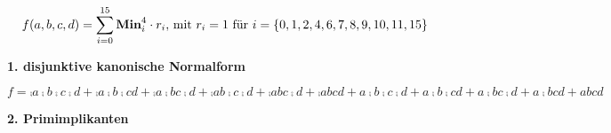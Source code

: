 \documentclass{CInf_practice}
\begin{document}
\begin{align*}
f(a,b,c,d) = \sum\limits^{15}_{i=0} \text{\bf Min}^{4}_i \cdot r_i, &\text{ mit } r_i=1 \text{ für } i = \left\{0,1,2,4,6,7,8,9,10,11,15\right\}
\end{align*}
%

\textbf{1. disjunktive kanonische Normalform}

$f = \comp a \comp b \comp c \comp d
   + \comp a \comp b \comp c       d
   + \comp a \comp b       c \comp d
   + \comp a       b \comp c \comp d
   + \comp a       b       c \comp d
   + \comp a       b       c       d
   +       a \comp b \comp c \comp d
   +       a \comp b \comp c       d
   +       a \comp b       c \comp d
   +       a \comp b       c       d
   +       a       b       c       d$
  
\bigskip

\textbf{2. Primimplikanten}
\end{document}
